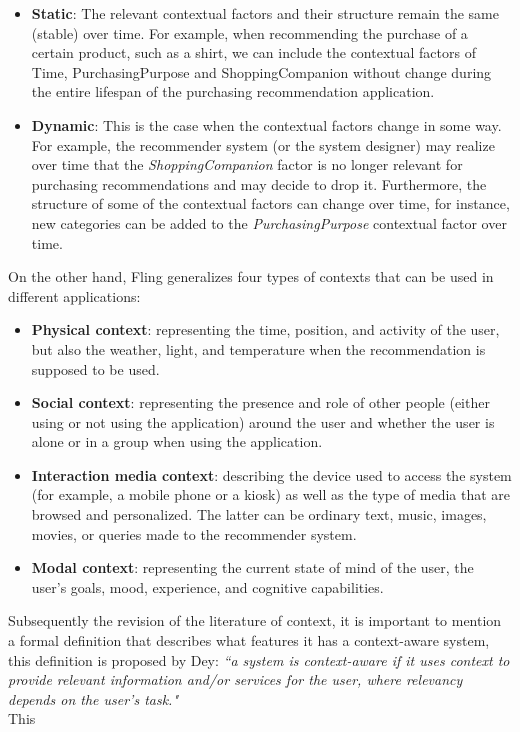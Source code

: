 	\begin{itemize}
	\item \textbf{Static}: The relevant contextual factors and their structure
	remain the same (stable) over time. For example, when recommending the
	purchase of a certain product, such as a shirt, we can include the
	contextual factors of Time, PurchasingPurpose and ShoppingCompanion 
	without change during the entire lifespan of the purchasing recommendation
	application.
	\item \textbf {Dynamic}: This is the case when the contextual factors 
	change in some way. For example, the recommender system (or the 
	system designer) may realize over time that the \textit{ShoppingCompanion} 
	factor is no longer relevant for purchasing recommendations and may 
	decide to drop it. Furthermore, the structure of some of the contextual
	factors can change over time, for instance, new categories can be
	added to the \textit{PurchasingPurpose} contextual factor over time.
	\end{itemize}
On the other hand, Fling\cite{fling2009mobile} generalizes four types of
contexts that can be used in different applications:  
\begin{itemize}  
\item \textbf{Physical context}: representing the time, position, and
activity of the user, but also the weather, light, and temperature
when the recommendation is supposed to be used.  
\item \textbf{Social context}: representing the presence and role 
of other people (either using or not using the application) around 
the user and whether the user is alone or in a group when using 
the application. 
\item \textbf{Interaction media context}: describing the device used to
access the system (for example, a mobile phone or a kiosk) as well as
the type of media that are browsed and personalized. The latter can be
ordinary text, music, images, movies, or queries made to the
recommender system.  
\item \textbf{Modal context}: representing the current state 
of mind of the user,  the user's goals, mood, experience, 
and cognitive capabilities. 
\end{itemize} 
Subsequently the revision of the literature of context, it is important
to mention a formal definition that describes what features it has a
context-aware system, this definition is proposed by
Dey\cite{dey2001understanding}: \textit{``a system is context-aware if
it uses context to provide relevant information and/or services for
the user, where relevancy  depends on the user's task."}\\ This
